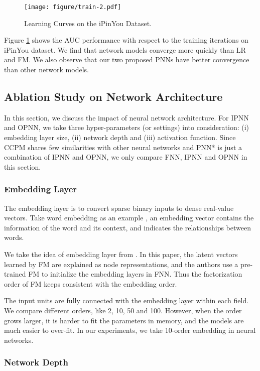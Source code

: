 \documentclass[conference]{IEEEtran}
\begin{document}
\begin{figure}[t]
	\centering
	\texttt{[image: figure/train-2.pdf]}
	\caption{Learning Curves on the iPinYou Dataset.}\label{fig:train}
\end{figure}

Figure \ref{fig:train} shows the AUC performance with respect to the training iterations on iPinYou dataset. We find that network models converge more quickly than LR and FM. We also observe that our two proposed PNNs have better convergence than other network models.


\subsection{Ablation Study on Network Architecture}\label{sec:arch}
In this section, we discuss the impact of neural network architecture.
For IPNN and OPNN,
we take three hyper-parameters (or settings) into consideration:
(i) embedding layer size, (ii) network depth and (iii) activation function. Since CCPM shares few similarities with other neural networks and PNN* is just a combination of IPNN and OPNN, we only compare FNN, IPNN and OPNN in this section.

\subsubsection{Embedding Layer}
The embedding layer is to convert sparse binary inputs to dense real-value vectors.
Take word embedding as an example \cite{mikolov2013distributed},
an embedding vector contains the information of the word and its context, and indicates the relationships between words.


We take the idea of embedding layer from \cite{zhang2016deep}. In this paper, the latent vectors learned by FM are explained as node representations, and the authors use a pre-trained FM to initialize the embedding layers in FNN. Thus the factorization order of FM keeps consistent with the embedding order.


The input units are fully connected with the embedding layer within each field.
We compare different orders, like 2, 10, 50 and 100. However, when the order grows larger, it is harder to fit the parameters in memory, and the models are much easier to over-fit.
In our experiments, we take 10-order embedding in neural networks.



\subsubsection{Network Depth}
\end{document}
